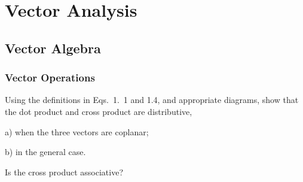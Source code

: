 \chapter{Vector Analysis}
\section{Vector Algebra}
\subsection{Vector Operations}
\begin{prob}
    Using the definitions in Eqs.~1.~1 and 1.4, and appropriate diagrams, show that the dot product and cross product are distributive,

    a) when the three vectors are coplanar;

    b) in the general case.
\end{prob}

\begin{prob}
    Is the cross product associative?
\end{prob}
